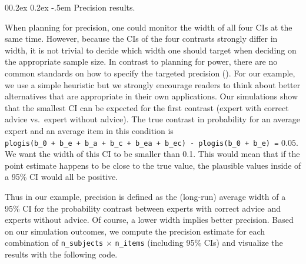 \documentclass[
  man,
  floatsintext,
  longtable,
  a4paper,
  nolmodern,
  notxfonts,
  notimes,
  colorlinks=true,linkcolor=blue,citecolor=blue,urlcolor=blue]{apa7}
\makeatletter
\renewcommand{\paragraph}{\@startsection{paragraph}{4}{\parindent}%
	{0\baselineskip \@plus 0.2ex \@minus 0.2ex}%
	{-.5em}%
	{\normalfont\normalsize\bfseries\typesectitle}}
\makeatother
\begin{document}
\paragraph{Precision results.}\label{precision-results}

When planning for precision, one could monitor the width of all four CIs
at the same time. However, because the CIs of the four contrasts
strongly differ in width, it is not trivial to decide which width one
should target when deciding on the appropriate sample size. In contrast
to planning for power, there are no common standards on how to specify
the targeted precision
(). For
our example, we use a simple heuristic but we strongly encourage readers
to think about better alternatives that are appropriate in their own
applications. Our simulations show that the smallest CI can be expected
for the first contrast (expert with correct advice vs.~expert without
advice). The true contrast in probability for an average expert and an
average item in this condition is
\texttt{plogis(b\_0\ +\ b\_e\ +\ b\_a\ +\ b\_c\ +\ b\_ea\ +\ b\_ec)\ -\ plogis(b\_0\ +\ b\_e)\ =}
\(0.05\). We want the width of this CI to be smaller than 0.1. This
would mean that if the point estimate happens to be close to the true
value, the plausible values inside of a 95\% CI would all be positive.

Thus in our example, precision is defined as the (long-run) average
width of a 95\% CI for the probability contrast between experts with
correct advice and experts without advice. Of course, a lower width
implies better precision. Based on our simulation outcomes, we compute
the precision estimate for each combination of \texttt{n\_subjects}
\(\times\) \texttt{n\_items} (including 95\% CIs) and visualize the
results with the following code.
\end{document}
